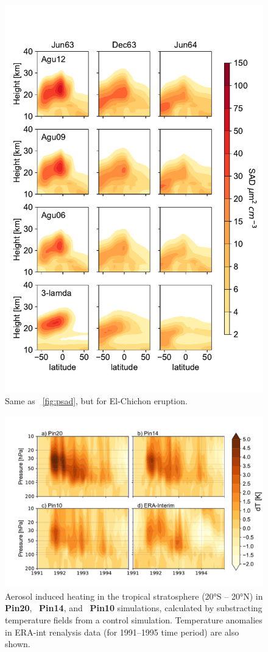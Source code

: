 \documentclass[acpd, hvmath, online]{copernicus_discussions}
\begin{document}
\newpage
\begin{figure}[ht!]
\includegraphics[width=.8\textwidth,height=.9\textheight,trim={0.1cm 0.1cm 0.1cm 0.1cm},clip]{Agu_sad.pdf}
\caption{Same as ~\ref{fig:psad}, but for El-Chichon eruption.} 
\label{fig:asad}
\end{figure}


\newpage
\begin{figure}[ht!]
\includegraphics[width=.8\textwidth,height=.6\textheight,trim={0.1cm 0.1cm 0.1cm 0.1cm},clip]{Pinatubo_dt.pdf}
\caption{Aerosol induced heating in the tropical stratosphere 
(20\si{\degree}S -- 20\si{\degree}N) in  \textbf{Pin20},
~\textbf{Pin14}, and ~\textbf{Pin10} simulations, 
calculated by substracting temperature fields from 
a control simulation.
 Temperature anomalies in ERA-int renalysis data (for 1991--1995 time period) 
are also shown.}
\label{fig:ptemp}
\end{figure}
\end{document}
